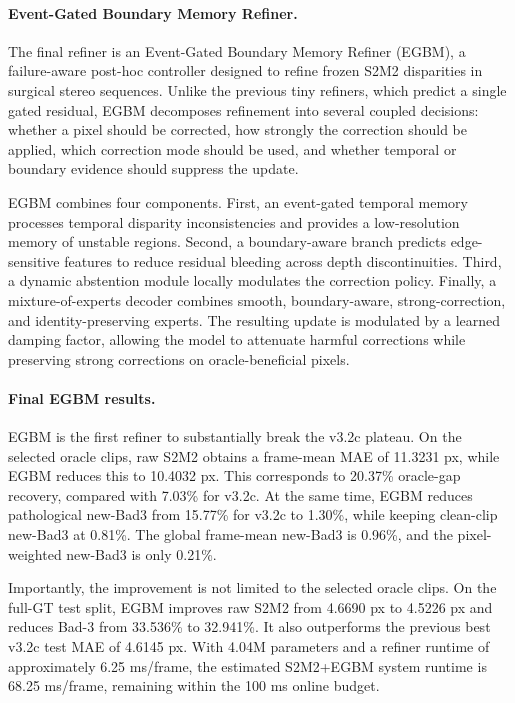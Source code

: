 \documentclass[11pt,a4paper]{article}
\begin{document}
\paragraph{Event-Gated Boundary Memory Refiner.}
The final refiner is an Event-Gated Boundary Memory Refiner (EGBM), a
failure-aware post-hoc controller designed to refine frozen S2M2 disparities in
surgical stereo sequences. Unlike the previous tiny refiners, which predict a
single gated residual, EGBM decomposes refinement into several coupled decisions:
whether a pixel should be corrected, how strongly the correction should be
applied, which correction mode should be used, and whether temporal or boundary
evidence should suppress the update.

EGBM combines four components. First, an event-gated temporal memory processes
temporal disparity inconsistencies and provides a low-resolution memory of
unstable regions. Second, a boundary-aware branch predicts edge-sensitive
features to reduce residual bleeding across depth discontinuities. Third, a
dynamic abstention module locally modulates the correction policy. Finally, a
mixture-of-experts decoder combines smooth, boundary-aware, strong-correction,
and identity-preserving experts. The resulting update is modulated by a learned
damping factor, allowing the model to attenuate harmful corrections while
preserving strong corrections on oracle-beneficial pixels.

\paragraph{Final EGBM results.}
EGBM is the first refiner to substantially break the v3.2c plateau. On the
selected oracle clips, raw S2M2 obtains a frame-mean MAE of 11.3231 px, while
EGBM reduces this to 10.4032 px. This corresponds to 20.37\% oracle-gap recovery,
compared with 7.03\% for v3.2c. At the same time, EGBM reduces pathological
new-Bad3 from 15.77\% for v3.2c to 1.30\%, while keeping clean-clip new-Bad3 at
0.81\%. The global frame-mean new-Bad3 is 0.96\%, and the pixel-weighted
new-Bad3 is only 0.21\%.

Importantly, the improvement is not limited to the selected oracle clips. On the
full-GT test split, EGBM improves raw S2M2 from 4.6690 px to 4.5226 px and
reduces Bad-3 from 33.536\% to 32.941\%. It also outperforms the previous best
v3.2c test MAE of 4.6145 px. With 4.04M parameters and a refiner runtime of
approximately 6.25 ms/frame, the estimated S2M2+EGBM system runtime is
68.25 ms/frame, remaining within the 100 ms online budget.
\end{document}
